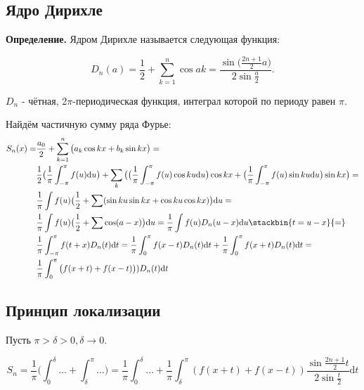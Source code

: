 \documentclass[12pt]{article}
\newcommand{\dd}{\ensuremath{\mathrm{d}}}
\begin{document}
\newpage
\subsection {Ядро Дирихле}

\textbf{Определение.} Ядром Дирихле называется следующая функция:

$$ D_n(a) = \frac{1}{2} + \sum_{k=1}^{n} \cos{ak} = \frac{\sin {\big(\frac{2n+1}{2} a \big)}}{2 \sin {\frac{a}{2}}}.$$

$D_n$ - чётная, 2$\pi$-периодическая функция, интеграл которой по периоду равен $\pi$.

\vspace{1em}

Найдём частичную сумму ряда Фурье:
 \begin{align*}
    S_n (x) = & \frac{a_0}{2} + \sum_{k=1}^{n} \big( a_k \cos{kx} + b_k \sin{kx} \big) = \\
              & \frac{1}{2} \big( \frac{1}{\pi} \int_{-\pi}^{\pi} f(u) \dd u \big) + \sum_{k} \big( \big( \frac{1}{\pi} \int_{-\pi}^{\pi} f(u)\cos{ku} \dd u \big) \cos{kx} 
              + \big( \frac{1}{\pi} \int_{-\pi}^{\pi} f(u) \sin{ku} \dd u \big) \sin{kx} \big) = \\ 
              & \frac{1}{\pi} \int f(u) \big( \frac{1}{2} + \sum (\sin{ku}\sin{kx} + \cos{ku}\cos{kx}) \big) \dd u = \\
              & \frac{1}{\pi} \int f(u) \big( \frac{1}{2} + \sum\cos(a-x) \big) \dd u = \frac{1}{\pi} \int f(u) D_n(u-x) \dd u \stackbin{t = u - x}{=} \\
              & \frac{1}{\pi} \int_{-\pi}^{\pi} f(t+x) D_n (t) \dd t = \frac{1}{\pi} \int_{0}^{\pi} f(x - t) D_n(t) \dd t + \frac{1}{\pi} \int_{0}^{\pi} f(x+t) D_n(t) \dd t = \\
              & \frac{1}{\pi} \int_{0}^{\pi} \big( f(x+t) + f(x-t) \big)) D_n(t) \dd t
          \end{align*}
  
  \subsection{Принцип локализации}
  
  
  Пусть $\pi > \delta > 0, \delta \rightarrow 0$.
  
  $$S_n = \frac{1}{\pi} \big( \int_{0}^{\delta} \dots + \int_{\delta}^{\pi} \dots \big) = 
  \frac{1}{\pi} \int_{0}^{\delta}\dots + \frac{1}{\pi} \int_{\delta}^{\pi} (f(x+t)+f(x-t)) \frac{\sin{\frac{2n+1}{2}t}}{2\sin{\frac{t}{2}}} \dd t$$
  
\end{document}
